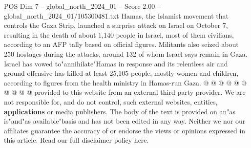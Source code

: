 \begin{textsample}{POS Dim 7 – global\_north\_2024\_01 – Score 2.00 – global\_north\_2024\_01/105300481.txt}
Hamas, the Islamist movement that controls the Gaza Strip, launched a surprise attack on Israel on October 7, resulting in the death of about 1,140 people in Israel, most of them civilians, according to an AFP tally based on official figures.
Militants also seized about 250 hostages during the attacks, around 132 of whom Israel says remain in Gaza.
Israel has vowed to"annihilate"Hamas in response and its relentless air and ground offensive has killed at least 25,105 people, mostly women and children, according to figures from the health ministry in Hamas-run Gaza. @ @ @ @ @ @ @ @ @ @ provided to this website from an external third party provider.
We are not responsible for, and do not control, such external websites, entities, \textbf{applications} or media publishers.
The body of the text is provided on an"as is"and"as available"basis and has not been edited in any way.
Neither we nor our affiliates guarantee the accuracy of or endorse the views or opinions expressed in this article.
Read our full disclaimer policy here.

\end{textsample}

